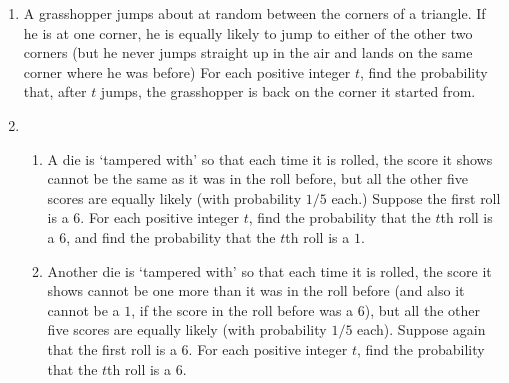 \documentclass[11pt,a4paper]{report}
\begin{document}
\begin{enumerate}
        \item  A grasshopper jumps about at random between the corners of a triangle. If he is at one corner, he is equally likely to jump to either of the other two corners (but he never jumps straight up in the air and lands on the same corner where he was before) For each positive integer $t$, find the probability that, after $t$ jumps, the grasshopper is back on the corner it started from.
        \item 
        \begin{enumerate}
            \item A die is ‘tampered with’ so that each time it is rolled, the score it shows cannot be the same as it was in the roll before, but all the other five scores are equally likely (with probability $1/5$ each.) Suppose the first roll is a $6$. For each positive integer $t$, find the probability that the $t$th roll is a $6$, and find the probability that the $t$th roll is a $1$.
            \item Another die is ‘tampered with’ so that each time it is rolled, the score it shows cannot be one more than it was in the roll before (and also it cannot be a $1$, if the score in the roll before was a $6$), but all the other five scores are equally likely (with probability $1/5$ each). Suppose again that the first roll is a $6$. For each positive integer $t$, find the probability that the $t$th roll is a $6$.
            
        \end{enumerate}
        
    \end{enumerate}
\end{document}
